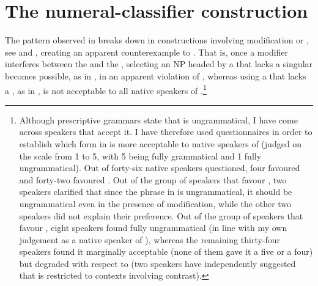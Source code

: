 \documentclass[output=paper,modfonts,newtxmath,hidelinks]{langscibook}
\begin{document}
\section{The numeral-classifier construction}\label{18:s2}
\largerpage[-1]
The pattern observed in  breaks down in constructions involving modification or , see  and , creating an apparent counterexample to . That is, once a modifier interferes between the  and the , selecting an NP headed by a  that lacks a singular  becomes possible, as in , in an apparent violation of , whereas using a  that lacks a  , as in , is not acceptable to all native speakers of .\footnote{\label{18:fn7}Although  prescriptive grammars state that  is ungrammatical, I have come across speakers that accept it. I have therefore used questionnaires in order to establish which form in  is more acceptable to native speakers of  (judged on the scale from 1 to 5, with 5 being fully grammatical and 1 fully ungrammatical). Out of forty-six native speakers questioned, four favoured  and forty-two favoured . Out of the group of speakers that favour , two speakers clarified that since the phrase in  is ungrammatical, it should be ungrammatical even in the presence of modification, while the other two speakers did not explain their preference. Out of the group of speakers that favour , eight speakers found  fully ungrammatical (in line with my own judgement as a native speaker of ), whereas the remaining thirty-four speakers found it marginally acceptable (none of them gave it a five or a four) but degraded with respect to  (two speakers have independently suggested that  is restricted to contexts involving contrast).} 
\ea \label{18:ex9}
	\z
\z
\end{document}
